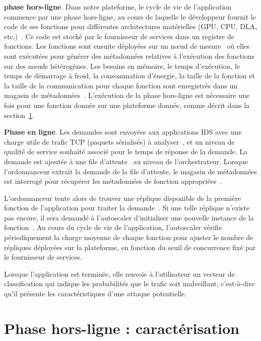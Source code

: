 \textbf{phase hors-ligne}. Dans notre plateforme, le cycle de vie de l'application commence par une phase hors-ligne, au cours de laquelle le développeur fournit le code de ses fonctions pour différentes architectures matérielles (GPU, CPU, DLA, etc.)~. Ce code est stocké par le fournisseur de services dans un registre de fonctions. Les fonctions sont ensuite déployées sur un nœud de mesure~ où elles sont exécutées pour générer des métadonnées relatives à l'exécution des fonctions sur des nœuds hétérogènes. Les besoins en mémoire, le temps d'exécution, le temps de démarrage à froid, la consommation d'énergie, la taille de la fonction et la taille de la communication pour chaque fonction sont enregistrés dans un magasin de métadonnées~. L'exécution de la phase hors-ligne est nécessaire une fois pour une fonction donnée sur une plateforme donnée, comme décrit dans la section~\ref{section:herocache-workload}.

\textbf{Phase en ligne}. Les demandes sont envoyées aux applications IDS avec une charge utile de trafic TCP (paquets sérialisés) à analyser~, et un niveau de qualité de service souhaité associé pour le temps de réponse de la demande. La demande est ajoutée à une file d'attente~ au niveau de l'orchestrateur. Lorsque l'ordonnanceur extrait la demande de la file d'attente, le magasin de métadonnées est interrogé pour récupérer les métadonnées de fonction appropriées~.

L'ordonnanceur tente alors de trouver une réplique disponible de la première fonction de l'application pour traiter la demande~. Si une telle réplique n'existe pas encore, il sera demandé à l'autoscaler d'initialiser une nouvelle instance de la fonction~. Au cours du cycle de vie de l'application, l'autoscaler vérifie périodiquement la charge moyenne de chaque fonction pour ajuster le nombre de répliques déployées sur la plateforme, en fonction du seuil de concurrence fixé par le fournisseur de services.

Lorsque l'application est terminée, elle renvoie à l'utilisateur un vecteur de classification qui indique les probabilités que le trafic soit malveillant, c'est-à-dire qu'il présente les caractéristiques d'une attaque potentielle.

\section{Phase hors-ligne : caractérisation} 
\label{section:herocache-workload}

